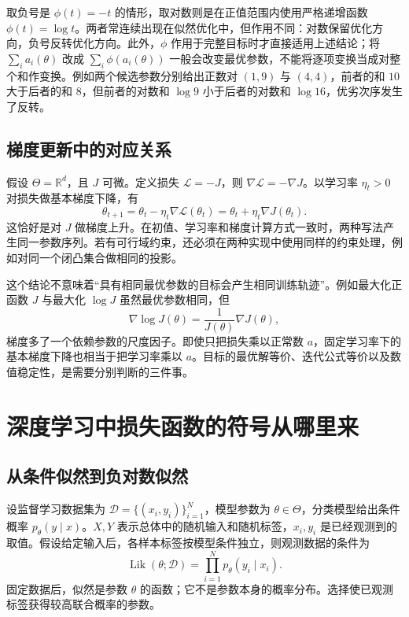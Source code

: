 \documentclass[UTF8]{ctexart}
\begin{document}
取负号是 $\phi(t)=-t$ 的情形，取对数则是在正值范围内使用严格递增函数 $\phi(t)=\log t$。两者常连续出现在似然优化中，但作用不同：对数保留优化方向，负号反转优化方向。此外，$\phi$ 作用于完整目标时才直接适用上述结论；将 $\sum_i a_i(\theta)$ 改成 $\sum_i\phi(a_i(\theta))$ 一般会改变最优参数，不能将逐项变换当成对整个和作变换。例如两个候选参数分别给出正数对 $(1,9)$ 与 $(4,4)$，前者的和 $10$ 大于后者的和 $8$，但前者的对数和 $\log9$ 小于后者的对数和 $\log16$，优劣次序发生了反转。

\subsection{梯度更新中的对应关系}

假设 $\Theta=\mathbb R^d$，且 $J$ 可微。定义损失 $\mathcal L=-J$，则 $\nabla\mathcal L=-\nabla J$。以学习率 $\eta_t>0$ 对损失做基本梯度下降，有
\begin{equation}
 \theta_{t+1}
 =\theta_t-\eta_t\nabla\mathcal L(\theta_t)
 =\theta_t+\eta_t\nabla J(\theta_t).
 \label{eq:duality-gradient-sign}
\end{equation}
这恰好是对 $J$ 做梯度上升。在初值、学习率和梯度计算方式一致时，两种写法产生同一参数序列。若有可行域约束，还必须在两种实现中使用同样的约束处理，例如对同一个闭凸集合做相同的投影。

这个结论不意味着“具有相同最优参数的目标会产生相同训练轨迹”。例如最大化正函数 $J$ 与最大化 $\log J$ 虽然最优参数相同，但
\[
 \nabla\log J(\theta)=\frac{1}{J(\theta)}\nabla J(\theta),
\]
梯度多了一个依赖参数的尺度因子。即使只把损失乘以正常数 $a$，固定学习率下的基本梯度下降也相当于把学习率乘以 $a$。目标的最优解等价、迭代公式等价以及数值稳定性，是需要分别判断的三件事。

\section{深度学习中损失函数的符号从哪里来}
\label{sec:duality-learning}

\subsection{从条件似然到负对数似然}

设监督学习数据集为 $\mathcal D=\{(x_i,y_i)\}_{i=1}^N$，模型参数为 $\theta\in\Theta$，分类模型给出条件概率 $p_\theta(y\mid x)$。$X,Y$ 表示总体中的随机输入和随机标签，$x_i,y_i$ 是已经观测到的取值。假设给定输入后，各样本标签按模型条件独立，则观测数据的条件为
\begin{equation}
 \operatorname{Lik}(\theta;\mathcal D)
 =\prod_{i=1}^N p_\theta(y_i\mid x_i).
 \label{eq:duality-likelihood}
\end{equation}
固定数据后，似然是参数 $\theta$ 的函数；它不是参数本身的概率分布。选择使已观测标签获得较高联合概率的参数。
\end{document}
